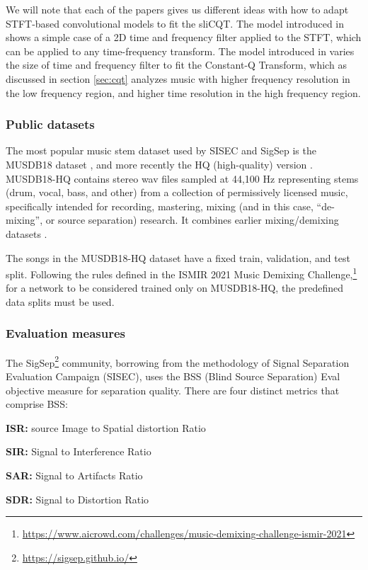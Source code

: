 \documentclass[report.tex]{subfiles}
\begin{document}
We will note that each of the papers gives us different ideas with how to adapt STFT-based convolutional models to fit the sliCQT. The model introduced in \textcite{plumbley1} shows a simple case of a 2D time and frequency filter applied to the STFT, which can be applied to any time-frequency transform. The model introduced in \textcite{plumbley2} varies the size of time and frequency filter to fit the Constant-Q Transform, which as discussed in section \ref{sec:cqt} analyzes music with higher frequency resolution in the low frequency region, and higher time resolution in the high frequency region.

\subsubsection{Public datasets}

The most popular music stem dataset used by SISEC and SigSep is the MUSDB18 dataset \parencite{musdb18}, and more recently the HQ (high-quality) version \parencite{musdb18hq}. MUSDB18-HQ contains stereo wav files sampled at 44,100 Hz representing stems (drum, vocal, bass, and other) from a collection of permissively licensed music, specifically intended for recording, mastering, mixing (and in this case, ``de-mixing'', or source separation) research. It combines earlier mixing/demixing datasets \parencite{sisec2016, otherdataset2}.

The songs in the MUSDB18-HQ dataset have a fixed train, validation, and test split. Following the rules defined in the ISMIR 2021 Music Demixing Challenge,\footnote{\url{https://www.aicrowd.com/challenges/music-demixing-challenge-ismir-2021}} for a network to be considered trained only on MUSDB18-HQ, the predefined data splits must be used.

\subsubsection{Evaluation measures}
\label{sec:evalbss}

The SigSep\footnote{\url{https://sigsep.github.io/}} community, borrowing from the methodology of Signal Separation Evaluation Campaign (SISEC), uses the BSS (Blind Source Separation) Eval \cite{bss} objective measure for separation quality. There are four distinct metrics that comprise BSS:

\begin{tight_itemize}
\item
	\textbf{ISR:} source Image to Spatial distortion Ratio
\item
	\textbf{SIR:} Signal to Interference Ratio
\item
	\textbf{SAR:} Signal to Artifacts Ratio
\item
	\textbf{SDR:} Signal to Distortion Ratio
\end{tight_itemize}
\end{document}
